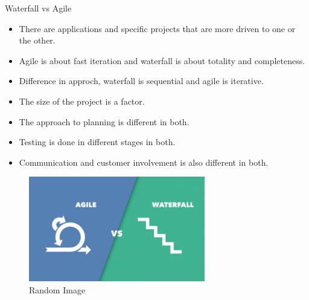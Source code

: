 \begin{section}{Waterfall vs Agile}
    
    \begin{itemize}
        \item There are applications and specific projects that are more driven to one or the other.
        \item Agile is about fast iteration and waterfall is about totality and completeness.
        \item Difference in approch, waterfall is sequential and agile is iterative.
        \item The size of the project is a factor.
        \item The approach to planning is different in both.
        \item Testing is done in different stages in both.
        \item Communication and customer involvement is also different in both.
    
    \end{itemize}
    \begin{figure}
        \centering
        \includegraphics[scale=0.2]{images/illustrate/agilevscascade.png}
        \caption{Random Image}
        \end{figure}
    \end{section}